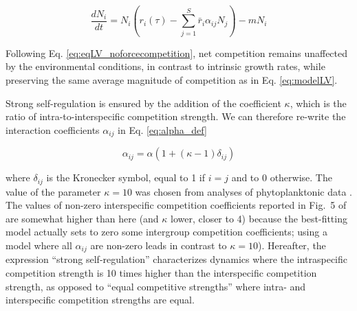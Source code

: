 \documentclass[a4paper,12pt]{article}
\begin{document}
\begin{equation}
\frac{dN_{i}}{dt}=N_{i}\left(r_{i}(\tau)-\sum_{j=1}^{S}\bar{r}_{i}\alpha_{ij}N_{j}\right)-mN_{i}\label{eq:eqLV_noforcecompetition}
\end{equation}

Following Eq. \ref{eq:eqLV_noforcecompetition}, net competition remains
unaffected by the environmental conditions, in contrast to intrinsic
growth rates, while preserving the same average magnitude of competition
as in Eq. \ref{eq:modelLV}.

Strong self-regulation is ensured by the addition of the coefficient
$\kappa$, which is the ratio of intra-to-interspecific competition
strength. We can therefore re-write the interaction coefficients $\alpha_{ij}$
in Eq. \ref{eq:alpha_def}

\begin{equation}
\alpha_{ij}=\alpha\left(1+(\kappa-1)\delta_{ij}\right)\label{eq:alpha_def}
\end{equation}

where $\delta_{ij}$ is the Kronecker symbol, equal to 1 if $i=j$
and to 0 otherwise. The value of the parameter $\kappa=10$ was chosen
from analyses of phytoplanktonic data \citep{barraquand2018coastal}. The values of non-zero interspecific competition coefficients reported in Fig.~5 of \citet{barraquand2018coastal} are somewhat higher than here (and $\kappa$ lower, closer to 4) because the best-fitting model actually sets to zero some intergroup competition coefficients; using a model where all $\alpha_{ij}$ are non-zero leads in contrast to $\kappa=10$). Hereafter, the expression ``strong self-regulation'' characterizes
dynamics where the intraspecific competition strength is 10 times
higher than the interspecific competition strength, as opposed to
``equal competitive strengths'' where intra- and interspecific competition
strengths are equal.
\end{document}
